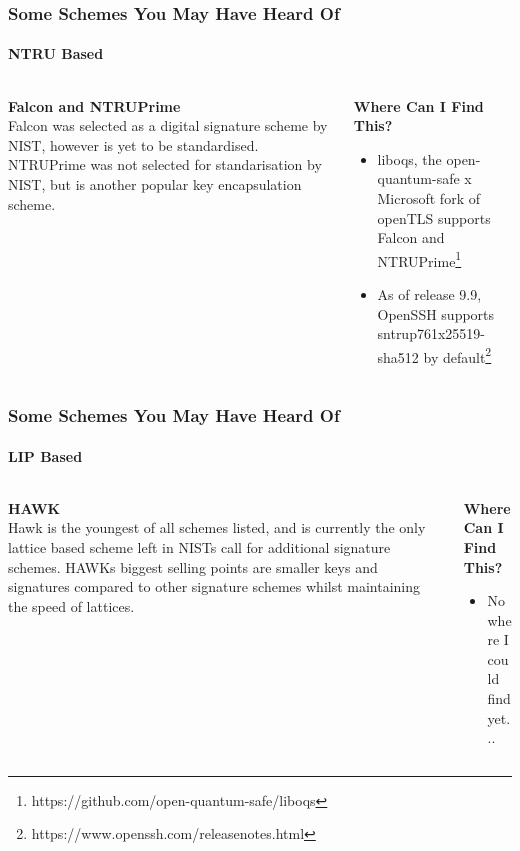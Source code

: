 \documentclass[
aspectratio=169, %
t, %
onlytextwidth, %
10pt, %
]{beamer}
\begin{document}
\begin{frame}
    \frametitle{Some Schemes You May Have Heard Of}
    \framesubtitle{NTRU Based}

    \begin{columns}[T] %
        \begin{column}{0.42\linewidth} %
            \textbf{Falcon and NTRUPrime}\\
            
            Falcon was selected as a digital signature scheme by NIST, however is yet to be standardised. NTRUPrime was not selected for standarisation by NIST, but is another popular key encapsulation scheme.
        \end{column}
        \begin{column}{0.55\linewidth} %
            \textbf{Where Can I Find This?}\\
            \begin{itemize}
                \item liboqs, the open-quantum-safe x Microsoft fork of openTLS supports Falcon and NTRUPrime\footnote{https://github.com/open-quantum-safe/liboqs}
                \item As of release 9.9, OpenSSH supports sntrup761x25519-sha512 by default\footnote{https://www.openssh.com/releasenotes.html}
            \end{itemize}
        \end{column}
    \end{columns}
\end{frame}


\begin{frame}
    \frametitle{Some Schemes You May Have Heard Of}
    \framesubtitle{LIP Based}

    \begin{columns}[T] %
        \begin{column}{0.58\linewidth} %
            \textbf{HAWK}\\
            
            Hawk is the youngest of all schemes listed, and is currently the only lattice based scheme left in NISTs call for additional signature schemes. HAWKs biggest selling points are smaller keys and signatures compared to other signature schemes whilst maintaining the speed of lattices.
        \end{column}
        \begin{column}{0.4\linewidth} %
            \textbf{Where Can I Find This?}\\
            \begin{itemize}
                \item No where I could find yet...
            \end{itemize}
        \end{column}
    \end{columns}
\end{frame}
\end{document}
